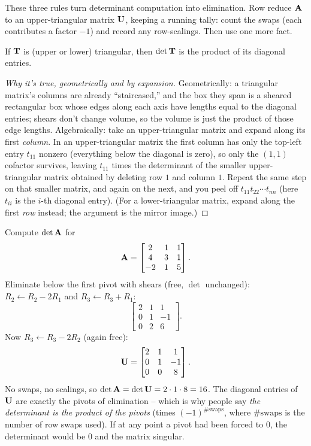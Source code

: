 These three rules turn determinant computation into elimination. Row reduce
$\mathbf{A}$ to an upper-triangular matrix $\mathbf{U}$, keeping a running tally: count
the swaps (each contributes a factor $-1$) and record any row-scalings. Then use
one more fact.

\begin{theorem}
\label{ch21:thm-triangular}
If $\mathbf{T}$ is (upper or lower) triangular, then $\det\mathbf{T}$ is the product of
its diagonal entries.
\end{theorem}

\begin{proof}[Why it's true, geometrically and by expansion]
Geometrically: a triangular matrix's columns are already ``staircased,'' and the
box they span is a sheared rectangular box whose edges along each axis have lengths
equal to the diagonal entries; shears don't change volume, so the volume is just
the product of those edge lengths. Algebraically: take an upper-triangular matrix
and expand along its first \emph{column}. In an upper-triangular matrix the first
column has only the top-left entry $t_{11}$ nonzero (everything below the diagonal
is zero), so only the $(1,1)$ cofactor survives, leaving $t_{11}$ times the
determinant of the smaller upper-triangular matrix obtained by deleting row $1$ and
column $1$. Repeat the same step on that smaller matrix, and again on the next,
and you peel off $t_{11}t_{22}\cdots t_{nn}$ (here $t_{ii}$ is the $i$-th diagonal
entry). (For a lower-triangular matrix, expand along the first
\emph{row} instead; the argument is the mirror image.)
\end{proof}

\begin{example}
\label{ch21:ex-elim}
Compute $\det\mathbf{A}$ for
\[
  \mathbf{A} = \begin{bmatrix} 2 & 1 & 1 \\ 4 & 3 & 1 \\ -2 & 1 & 5 \end{bmatrix}.
\]
Eliminate below the first pivot with shears (free, $\det$ unchanged):
$R_2 \leftarrow R_2 - 2R_1$ and $R_3 \leftarrow R_3 + R_1$:
\[
  \begin{bmatrix} 2 & 1 & 1 \\ 0 & 1 & -1 \\ 0 & 2 & 6 \end{bmatrix}.
\]
Now $R_3 \leftarrow R_3 - 2R_2$ (again free):
\[
  \mathbf{U} = \begin{bmatrix} 2 & 1 & 1 \\ 0 & 1 & -1 \\ 0 & 0 & 8 \end{bmatrix}.
\]
No swaps, no scalings, so $\det\mathbf{A} = \det\mathbf{U} = 2\cdot 1\cdot 8 = 16$. The
diagonal entries of $\mathbf{U}$ are exactly the pivots of elimination -- which is why
people say \emph{the determinant is the product of the pivots} (times $(-1)^{\#
\text{swaps}}$, where $\#\text{swaps}$ is the number of row swaps used). If at any point a pivot had been forced to $0$, the determinant
would be $0$ and the matrix singular.
\end{example}

